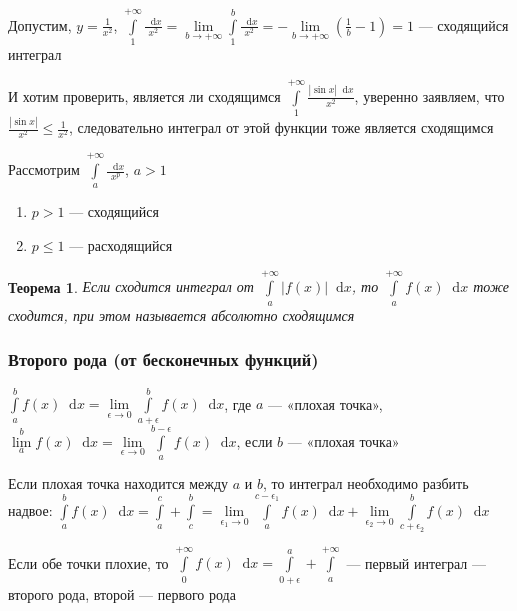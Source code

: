 \documentclass{article}
\newcommand*\diff{\mathop{}\!\mathrm{d}}
\newtheorem{theorem}{Теорема}
\begin{document}
Допустим, $y = \frac{1}{x^2}$, $\int\limits_{1}^{+\infty} \frac{\diff x}{x^2} = \lim\limits_{b \to +\infty} \int\limits_{1}^{b} \frac{\diff x}{x^2} = -\lim\limits_{b \to +\infty} (\frac{1}{b} - 1) = 1$ — сходящийся интеграл

И хотим проверить, является ли сходящимся $\int\limits_{1}^{+\infty} \frac{|\sin x| \diff x}{x^2}$, уверенно заявляем, что $\frac{|\sin x|}{x^2} \le \frac{1}{x^2}$, следовательно интеграл от этой функции тоже является сходящимся

\hfill

Рассмотрим $\int\limits_{a}^{+\infty} \frac{\diff x}{x^p}$, $a > 1$

\begin{enumerate}
    \item $p > 1$ — сходящийся
    \item $p \le 1$ — расходящийся
\end{enumerate}

\begin{theorem}
    Если сходится интеграл от $\int\limits_{a}^{+\infty} |f(x)| \diff x$, то $\int\limits_{a}^{+\infty} f(x) \diff x$ тоже сходится, при этом называется абсолютно сходящимся
\end{theorem}

\subsubsection{Второго рода (от бесконечных функций)}

$\int\limits_{a}^{b} f(x) \diff x = \lim\limits_{\epsilon \to 0} \int\limits_{a + \epsilon}^{b} f(x) \diff x$, где $a$ — «плохая точка», $\lim\limits_{a}^{b} f(x) \diff x = \lim\limits_{\epsilon \to 0} \int\limits_{a}^{b - \epsilon} f(x) \diff x$, если $b$ — «плохая точка»

Если плохая точка находится между $a$ и $b$, то интеграл необходимо разбить надвое: $\int\limits_{a}^{b} f(x) \diff x = \int\limits_{a}^{c} + \int\limits_{c}^{b} = \lim\limits_{\epsilon_1 \to 0} \int\limits_{a}^{c - \epsilon_1} f(x) \diff x + \lim\limits_{\epsilon_2 \to 0} \int\limits_{c + \epsilon_2}^{b} f(x) \diff x$

\hfill

Если обе точки плохие, то $\int\limits_{0}^{+\infty} f(x) \diff x = \int\limits_{0 + \epsilon}^{a} + \int\limits_{a}^{+\infty}$ — первый интеграл — второго рода, второй — первого рода

\hfill

\hfill
\end{document}
